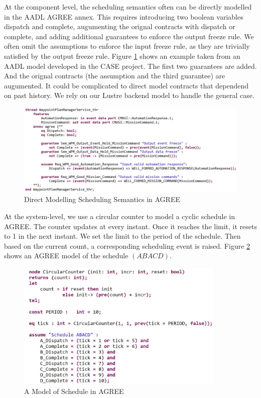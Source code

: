 At the component level, the scheduling semantics often can be directly modelled in the AADL AGREE annex. This requires introducing two boolean variables dispatch and complete, augumenting the orignal contracts with dispatch or complete, and adding additional guarantees to enforce the output freeze rule. We often omit the assumptions to enforce the input freeze rule, as they are trivially satisfied by the output freeze rule.
Figure \ref{wpmAGREE} shows an example taken from an AADL model developed in the CASE project. The first two guarantees are added. And the orignal contracts (the assumption and the third guarantee) are augumented. 
It could be complicated to direct model contracts that dependend on past history. We rely on our Lustre backend model to handle the general case.

\begin{figure}[ht!]
\centering
\includegraphics[width=130mm]{wpmAGREE3.jpg}
\caption{Direct Modelling Scheduling Semantics in AGREE\label{wpmAGREE}}
\end{figure}

At the system-level, we use a circular counter to model a cyclic schedule in AGREE. 
The counter updates at every instant. Once it reaches the limit, it resets to 1 in the next instant.
We set the limit to the period of the schedule. 
Then based on the current count, a corresponding scheduling event is raised.
Figure \ref{schedule} shows an AGREE model of the schedule $(ABACD)$.

\begin{figure}[ht!]
\centering
\includegraphics[width=100mm]{schedule.jpg}
\caption{A Model of Schedule in AGREE\label{schedule}}
\end{figure}

